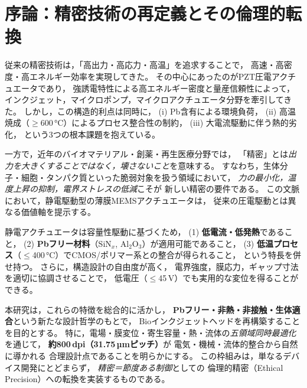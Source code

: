 \section{序論：精密技術の再定義とその倫理的転換}
従来の精密技術は，「高出力・高応力・高温」を追求することで，
高速・高密度・高エネルギー効率を実現してきた。
その中心にあったのがPZT圧電アクチュエータであり，
強誘電特性による高エネルギー密度と量産信頼性によって，
インクジェット，マイクロポンプ，マイクロアクチュエータ分野を牽引してきた。
しかし，この構造的利点は同時に，
(i) Pb含有による環境負荷，  
(ii) 高温焼成（$\geq$600\,\si{\celsius}）によるプロセス整合性の制約，  
(iii) 大電流駆動に伴う熱的劣化，  
という3つの根本課題を抱えている。

一方で，近年のバイオマテリアル・創薬・再生医療分野では，
「精密」とは\emph{出力を大きくすることではなく，壊さないこと}を意味する。
すなわち，生体分子・細胞・タンパク質といった脆弱対象を扱う領域において，
\emph{力の最小化，温度上昇の抑制，電界ストレスの低減}こそが
新しい精密の要件である。
この文脈において，静電駆動型の薄膜MEMSアクチュエータは，
従来の圧電駆動とは異なる価値軸を提示する。

静電アクチュエータは容量性駆動に基づくため，
(1) \textbf{低電流・低発熱}であること，  
(2) \textbf{Pbフリー材料}（SiN$_x$, Al$_2$O$_3$）が適用可能であること，  
(3) \textbf{低温プロセス}（$\leq$400\,\si{\celsius}）でCMOS/ポリマー系との整合が得られること，  
という特長を併せ持つ。
さらに，構造設計の自由度が高く，
電界強度，膜応力，ギャップ寸法を適切に協調させることで，
低電圧（$\leq$45\,V）でも実用的な変位を得ることができる。

本研究は，これらの特徴を総合的に活かし，
\textbf{Pbフリー・非熱・非接触・生体適合}という新たな設計哲学のもとで，
Bioインクジェットヘッドを再構築することを目的とする。
特に，電場・膜変位・寄生容量・熱・流体の\emph{五領域同時最適化}を通じて，
\textbf{約800\,dpi（31.75\,µmピッチ）}が
電気・機械・流体的整合から自然に導かれる
合理設計点であることを明らかにする。
この枠組みは，単なるデバイス開発にとどまらず，
\emph{精密＝節度ある制御}としての
倫理的精密（Ethical Precision）への転換を実装するものである。
